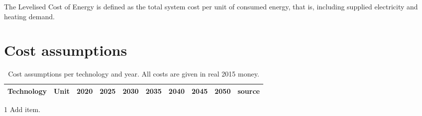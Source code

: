 \documentclass[3p]{elsarticle} %
\begin{document}
The Levelised Cost of Energy is defined as the total system cost per unit of consumed energy, that is, including supplied electricity and heating demand. \\


\section{Cost assumptions}	

\begin{table}[!b]
\footnotesize
\centering
\begin{threeparttable}
\caption{Cost assumptions per technology and year. All costs are given in real 2015 money. } \label{tab:cost per year}
\centering
\begin{tabularx}{18cm}{lccccccccr}
\toprule
Technology\tnote{1}& Unit & 2020&2025&2030&2035&2040&2045&2050&source\\
\midrule

\bottomrule
\end{tabularx}
\begin{tablenotes}
\item[1] Add item.
\end{tablenotes}
\end{threeparttable}
\end{table}
\end{document}
